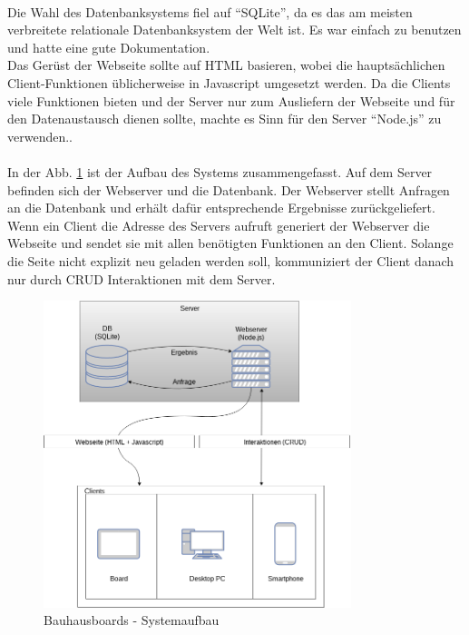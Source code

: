 \\
Die Wahl des Datenbanksystems fiel auf ``SQLite''\cite{sqlite:website}, da es das am meisten verbreitete relationale Datenbanksystem der Welt ist. Es war einfach zu benutzen und hatte eine gute Dokumentation.
\\
Das Gerüst der Webseite sollte auf HTML basieren, wobei die hauptsächlichen Client-Funktionen üblicherweise in Javascript umgesetzt werden. Da die Clients viele Funktionen bieten und der Server nur zum Ausliefern der Webseite und für den Datenaustausch dienen sollte, machte es Sinn für den Server ``Node.js'' zu verwenden..
\\
\\
In der Abb. \ref{img:Systemaufbau} ist der Aufbau des Systems zusammengefasst. Auf dem Server befinden sich der Webserver und die Datenbank. Der Webserver stellt Anfragen an die Datenbank und erhält dafür entsprechende Ergebnisse zurückgeliefert.
\\
Wenn ein Client die Adresse des Servers aufruft generiert der Webserver die Webseite und sendet sie mit allen benötigten Funktionen an den Client. Solange die Seite nicht explizit neu geladen werden soll, kommuniziert der Client danach nur durch CRUD Interaktionen mit dem Server.
\\
\begin{figure}[h!]
  \centering
    \includegraphics[width=0.8\textwidth]{./img/Systemaufbau.png}
  \caption{Bauhausboards - Systemaufbau}
  \label{img:Systemaufbau}
\end{figure}
